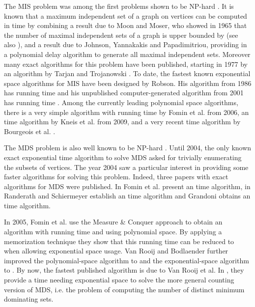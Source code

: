 \documentclass[a4paper,10pt]{article}
\theoremstyle{plain}
\theoremstyle{definition}
\theoremstyle{remark}
\newcommand{\MISpb}{\textsc{MIS}\xspace}
\newcommand{\MDSpb}{\textsc{MDS}\xspace}
\begin{document}
\smallskip

The \MISpb problem was among the first problems shown to be NP-hard \cite{GareyJ79}.
It is known that a maximum independent set of a graph on  vertices can be computed in  time
by combining a result due to Moon and Moser, who showed in 1965 
that the number of maximal independent sets of a graph is upper
bounded by  \cite{MoonMoser} (see also \cite{MillerM60}), and a result due to Johnson, Yannakakis and Papadimitriou,
providing in \cite{Johnson} a polynomial delay algorithm to generate all maximal
independent sets.
Moreover many exact algorithms for this problem have been published, starting
in 1977 by an  algorithm by Tarjan and Trojanowski \cite{Tarjan}.
To date, the fastest known exponential space algorithms for \MISpb have been
designed by Robson. His algorithm from 1986 \cite{Robson} has running time  and
his unpublished computer-generated algorithm from 2001 \cite{RobsonTR} has
running time .
Among the currently leading polynomial space algorithms, there is a very simple algorithm with running
time  by Fomin et al. \cite{soda2006,AcmFGK} from 2006,
an  time algorithm by Kneis et al. \cite{KneisFSTTCS2009} from 2009,
and a very recent  time algorithm by Bourgeois et al. \cite{BourgeoisSWAT2010}.

\smallskip

The \MDSpb problem
is also well known to be NP-hard \cite{GareyJ79}.
Until 2004, the only known exact exponential time algorithm to solve \MDSpb
asked for trivially enumerating the  subsets of vertices. The year 2004 saw a particular
interest in providing some faster algorithms for solving
this problem. Indeed, three papers with exact algorithms for \MDSpb were published.
In \cite{WG2004} Fomin et al. present an  time algorithm, in
\cite{Randerath} Randerath and Schiermeyer establish an  time algorithm
and Grandoni \cite{Grandoni} obtains an  time algorithm.

In 2005, Fomin et al. \cite{icalp2005,AcmFGK} use the Measure \& Conquer approach to obtain an algorithm with
running time 
and using polynomial space. By applying a memorization technique they show that this running
time can be reduced to  when allowing exponential space usage.
Van Rooij and Bodlaender \cite{vanRooijSTACS2008} further improved the polynomial-space algorithm
to  and the exponential-space algorithm to .
By now, the fastest published algorithm is due to Van Rooij et al. In \cite{vanRooijESA2009}, they provide
a  time needing exponential space to solve the more general counting version of \MDSpb, 
i.e. the problem of computing the number of distinct minimum dominating sets.
\end{document}
